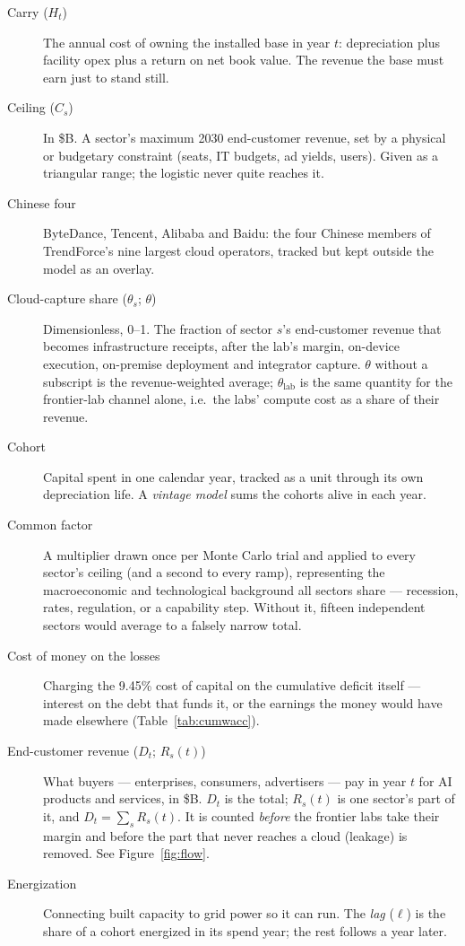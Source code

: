 \documentclass[11pt,letterpaper]{article}
\begin{document}
\begin{description}
\item[Carry ($H_t$)] The annual cost of owning the installed base in year $t$: depreciation plus facility opex plus a return on net book value. The revenue the base must earn just to stand still.
\item[Ceiling ($C_s$)] In \$B. A sector's maximum 2030 end-customer revenue, set by a physical or budgetary constraint (seats, IT budgets, ad yields, users). Given as a triangular range; the logistic never quite reaches it.
\item[Chinese four] ByteDance, Tencent, Alibaba and Baidu: the four Chinese members of TrendForce's nine largest cloud operators, tracked but kept outside the model as an overlay.
\item[Cloud-capture share ($\theta_s$; $\theta$)] Dimensionless, 0--1. The fraction of sector $s$'s end-customer revenue that becomes infrastructure receipts, after the lab's margin, on-device execution, on-premise deployment and integrator capture. $\theta$ without a subscript is the revenue-weighted average; $\theta_{\text{lab}}$ is the same quantity for the frontier-lab channel alone, i.e.\ the labs' compute cost as a share of their revenue.
\item[Cohort] Capital spent in one calendar year, tracked as a unit through its own depreciation life. A \emph{vintage model} sums the cohorts alive in each year.
\item[Common factor] A multiplier drawn once per Monte Carlo trial and applied to every sector's ceiling (and a second to every ramp), representing the macroeconomic and technological background all sectors share --- recession, rates, regulation, or a capability step. Without it, fifteen independent sectors would average to a falsely narrow total.
\item[Cost of money on the losses] Charging the 9.45\% cost of capital on the cumulative deficit itself --- interest on the debt that funds it, or the earnings the money would have made elsewhere (Table~\ref{tab:cumwacc}).
\item[End-customer revenue ($D_t$; $R_s(t)$)] What buyers --- enterprises, consumers, advertisers --- pay in year $t$ for AI products and services, in \$B. $D_t$ is the total; $R_s(t)$ is one sector's part of it, and $D_t=\sum_s R_s(t)$. It is counted \emph{before} the frontier labs take their margin and before the part that never reaches a cloud (leakage) is removed. See Figure~\ref{fig:flow}.
\item[Energization] Connecting built capacity to grid power so it can run. The \emph{lag} ($\ell$) is the share of a cohort energized in its spend year; the rest follows a year later.

\end{description}
\end{document}
